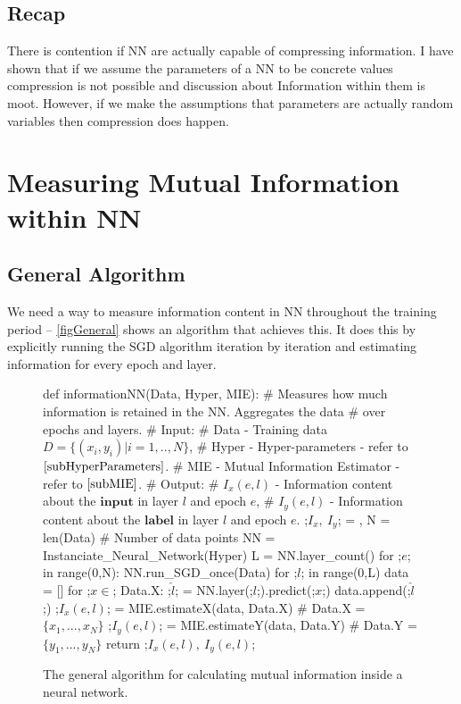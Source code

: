 \documentclass[dissertation.tex]{subfiles}
\begin{document}
\subsection{Recap}

There is contention if NN are actually capable of compressing information. 
I have shown that if we assume the parameters of a NN to be concrete values
compression is not possible and discussion about Information within them is
moot. However, if we make the assumptions that parameters are actually random
variables then compression does happen.

\section{Measuring Mutual Information within NN}

\subsection{General Algorithm}

We need a way to measure information content in NN throughout the training
period -- \autoref{figGeneral} shows an algorithm that achieves this. It does
this by explicitly running the SGD algorithm iteration by iteration and
estimating information for every epoch and layer.

\begin{figure}[H]
    \begin{pythonfigure}
      def informationNN(Data, Hyper, MIE):
      # Measures how much information is retained in the NN. Aggregates the data
      # over epochs and layers.
      # Input:
      # Data  - Training data $D=\{(x_i, y_i)|i=1,..,N\}$,
      # Hyper - Hyper-parameters - refer to $\autoref{subHyperParameters}$.
      # MIE   - Mutual Information Estimator - refer to $\autoref{subMIE}$.
      # Output:
      # $I_x(e, l)$ - Information content about the $\textbf{input}$ in layer $l$ and epoch $e$,
      # $I_y(e, l)$ - Information content about the $\textbf{label}$  in layer $l$ and epoch $e$.
      ;$I_x,\ I_y$; = {}, {}
      N = len(Data) # Number of data points
      NN = Instanciate_Neural_Network(Hyper)
      L = NN.layer_count()
      for ;$e$; in range(0,N):
        NN.run_SGD_once(Data)
        for ;$l$; in range(0,L)
          data = []
          for ;$x\in$; Data.X:
            ;$\hat{l}$; = NN.layer(;$l$;).predict(;$x$;)
            data.append(;$\hat{l}$;)
          ;$I_x(e,l)$; = MIE.estimateX(data, Data.X) # Data.X = $\{x_1,...,x_N\}$
          ;$I_y(e,l)$; = MIE.estimateY(data, Data.Y) # Data.Y = $\{y_1,...,y_N\}$
      return ;$I_x(e,l),\ I_y(e,l)$;
    \end{pythonfigure}
    \caption{The general algorithm for calculating mutual information inside a
    neural network.}
    \label{figGeneral}
\end{figure}
\end{document}
